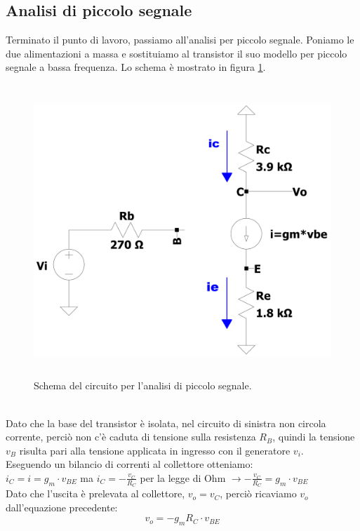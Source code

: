 \documentclass{report}
\begin{document}
\subsection{Analisi di piccolo segnale} \label{CEv3_pscap}
Terminato il punto di lavoro, passiamo all'analisi per piccolo segnale. Poniamo le due alimentazioni a massa e sostituiamo al transistor il suo modello per piccolo segnale a bassa frequenza. Lo schema è mostrato in figura \ref{figura:CEv2_ps}.
\begin{figure}[h]
\centering
\includegraphics[height=11cm]{immagini/CEv2_ps}
\caption{Schema del circuito per l'analisi di piccolo segnale.}
\label{figura:CEv2_ps}
\end{figure}
\\Dato che la base del transistor è isolata, nel circuito di sinistra non circola corrente, perciò non c'è caduta di tensione sulla resistenza $R_B$, quindi la tensione $v_B$ risulta pari alla tensione applicata in ingresso con il generatore $v_i$.
\\Eseguendo un bilancio di correnti al collettore otteniamo:
\\[2pt]\indent$i_C=i=g_m\cdot v_{BE}$ ma $\displaystyle{i_C=-\frac{v_C}{R_C}}$ per la legge di Ohm $\displaystyle{\rightarrow -\frac{v_C}{R_C}=g_m\cdot v_{BE}}$
\\[2pt]Dato che l'uscita è prelevata al collettore, $v_o=v_C$, perciò ricaviamo $v_o$ dall'equazione precedente:
\begin{equation}
v_o=-g_m R_C\cdot v_{BE}
\label{f1}
\end{equation}
\end{document}
